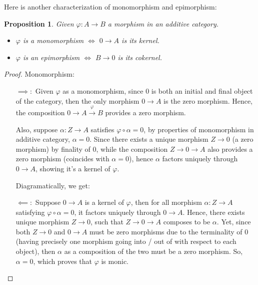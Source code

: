 \documentclass[x11names,reqno,12pt]{extarticle}
\newtheorem{prop}{Proposition}
\begin{document}
Here is another characterization of monomorphism and epimorphism:
\begin{prop}
    Given $\varphi:A\rightarrow B$ a morphism in an additive category.
    \begin{itemize}
        \item $\varphi$ is a monomorphism $\iff$ $0\rightarrow A$ is its kernel.
        \item $\varphi$ is an epimorphism $\iff$ $B\rightarrow 0$ is its cokernel.
    \end{itemize}
\end{prop}
\begin{proof}
    Monomorphism:
    \begin{itemize}
        \item[$\implies:$] Given $\varphi$ as a monomorphism, since $0$ is both an initial and final object of the category, then the only morphism $0\rightarrow A$ is the zero morphism.
        Hence, the composition $0\rightarrow A \xrightarrow{\varphi}B$ provides a zero morphism.

        Also, suppose $\alpha:Z\rightarrow A$ satisfies $\varphi\circ \alpha = 0$, by properties of monomorphism in additive category, $\alpha=0$. Since there exists a unique morphism $Z\rightarrow 0$ (a zero morphism) by finality of $0$, while the composition $Z\rightarrow 0\rightarrow A$ also provides a zero morphism (coincides with $\alpha=0$), hence $\alpha$ factors uniquely through $0\rightarrow A$, showing it's a kernel of $\varphi$.

        Diagramatically, we get:
        \begin{center}
        \end{center}

        \item[$\impliedby:$] Suppose $0\rightarrow A$ is a kernel of $\varphi$, then for all morphism $\alpha:Z\rightarrow A$ satisfying $\varphi\circ\alpha=0$, it factors uniquely through $0\rightarrow A$. Hence, there exists unique morphism $Z\rightarrow 0$, such that $Z\rightarrow 0\rightarrow A$ composes to be $\alpha$. Yet, since both $Z\rightarrow 0$ and $0\rightarrow A$ must be zero morphisms due to the terminality of $0$ (having precisely one morphism going into / out of with respect to each object), then $\alpha$ as a composition of the two must be a zero morphism. So, $\alpha=0$, which  proves that $\varphi$ is monic.
    \end{itemize}


\end{proof}
\end{document}
